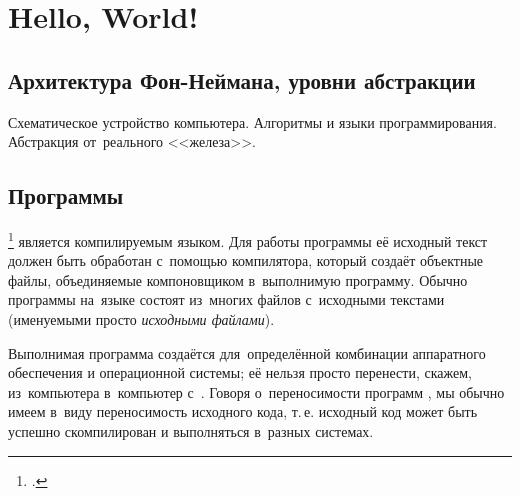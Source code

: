 
\chapter{Hello, World!}

\section{Архитектура Фон-Неймана, уровни абстракции}
Схематическое устройство компьютера. Алгоритмы и языки программирования. Абстракция от~реального <<железа>>.



\section{Программы}
\footcite{Stroustrup:2019:ru} является компилируемым языком. Для работы программы её исходный текст должен быть обработан с~помощью компилятора, который создаёт объектные файлы, объединяемые компоновщиком в~выполнимую программу. Обычно программы на~языке  состоят из~многих файлов с~исходными текстами (именуемыми просто \textit{исходными файлами}).

\begin{center}\end{center}

Выполнимая программа создаётся для~определённой комбинации аппаратного обеспечения и операционной системы; её нельзя просто перенести, скажем, из~компьютера  в~компьютер с~. Говоря о~переносимости программ , мы обычно имеем в~виду переносимость исходного кода, т.\,е. исходный код может быть успешно скомпилирован и выполняться в~разных
системах.

